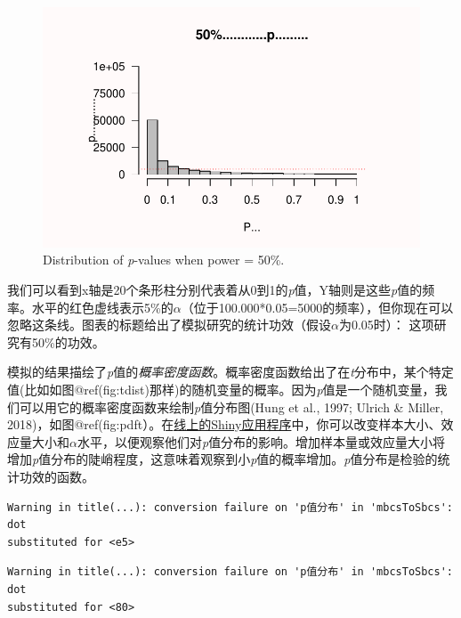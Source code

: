 \documentclass[
  letterpaper,
  DIV=11,
  numbers=noendperiod]{scrreprt}
\begin{document}
\begin{figure}

{\centering \includegraphics[width=1\textwidth,height=\textheight]{01-pvalue_files/figure-pdf/fig-pdistr1-1.pdf}

}

\caption{\label{fig-pdistr1}Distribution of \emph{p}-values when power =
50\%.}

\end{figure}

我们可以看到x轴是20个条形柱分别代表着从0到1的\emph{p}值，Y轴则是这些\emph{p}值的频率。水平的红色虚线表示5\%的\(\alpha\)（位于100.000*0.05=5000的频率），但你现在可以忽略这条线。图表的标题给出了模拟研究的统计功效（假设\(\alpha\)为0.05时）：
这项研究有50\%的功效。

模拟的结果描绘了\emph{p}值的\emph{概率密度函数}。概率密度函数给出了在\emph{t}分布中，某个特定值(比如如图@ref(fig:tdist)那样)的随机变量的概率。因为\emph{p}值是一个随机变量，我们可以用它的概率密度函数来绘制\emph{p}值分布图(Hung
et al., 1997; Ulrich \& Miller,
2018)，如图@ref(fig:pdft）。在\href{http://shiny.ieis.tue.nl/d_p_power/}{线上的Shiny应用程序}中，你可以改变样本大小、效应量大小和\(\alpha\)水平，以便观察他们对\emph{p}值分布的影响。增加样本量或效应量大小将增加\emph{p}值分布的陡峭程度，这意味着观察到小\emph{p}值的概率增加。\emph{p}值分布是检验的统计功效的函数。

\begin{verbatim}
Warning in title(...): conversion failure on 'p值分布' in 'mbcsToSbcs': dot
substituted for <e5>
\end{verbatim}

\begin{verbatim}
Warning in title(...): conversion failure on 'p值分布' in 'mbcsToSbcs': dot
substituted for <80>
\end{verbatim}
\end{document}
